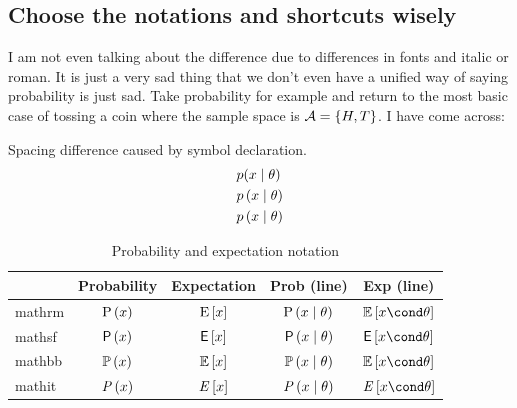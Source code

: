 \documentclass[aos,preprint]{imsart}
\begin{document}
\subsection{Choose the notations and shortcuts wisely}

I am not even talking about the difference due to differences in fonts and italic or roman.
It is just a very sad thing that we don't even have a unified way of saying probability is just sad.
Take probability for example and return to the most basic case of tossing a
coin
where the sample space is $\Ac = \{H, T\}$. I have come across:

Spacing difference caused by symbol declaration.
\begin{align*}
	&p(x\mid\theta) \\
	&\PR[p]{x\mid\theta}\\
	&\condPR[p]{x}{\theta}
\end{align*}

\begin{table}[ht]
	\centering
	\caption{Probability and expectation notation}
	\begin{tabular}{lcccc}
		\toprule
		 & Probability &  Expectation & Prob (line) & Exp (line) \\
		\midrule
		mathrm & $\PR{x}$ & $\ERW[\mathrm{E}]{x}$ & $\condPR{x}{\theta}$ & $\condERW{x}{\theta}$ \\
		mathsf & $\PR[\mathsf{P}]{x}$   & $\ERW[\mathsf{E}]{x}$ & $\condPR[\mathsf{P}]{x}{\theta}$ & $\condERW[\mathsf{E}]{x}{\theta}$ \\
		mathbb & $\PR[\mathbb{P}]{x}$   & $\ERW[\mathbb{E}]{x}$ & $\condPR[\mathbb{P}]{x}{\theta}$ & $\condERW[\mathbb{E}]{x}{\theta}$ \\
		mathit & $\PR[\mathit{P}]{x}$   & $\ERW[\mathit{E}]{x}$ & $\condPR[\mathit{P}]{x}{\theta}$ & $\condERW[\mathit{E}]{x}{\theta}$ \\
		\bottomrule
	\end{tabular}
\end{table}
\end{document}
